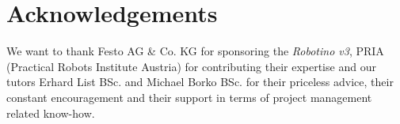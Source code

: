 \section*{Acknowledgements}
\cfoot{}

We want to thank Festo AG \& Co. KG for sponsoring the \textit{Robotino v3}, PRIA (Practical Robots Institute Austria) for contributing their expertise and our tutors Erhard List BSc. and Michael Borko BSc. for their priceless advice, their constant encouragement and their support in terms of project management related know-how.

